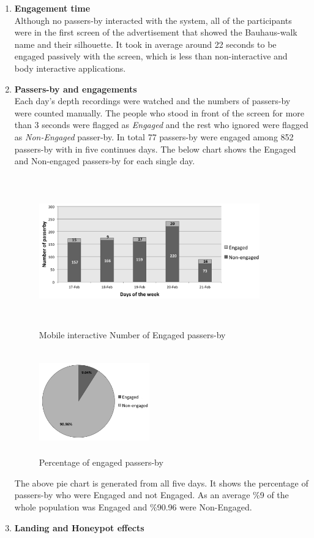 \begin{enumerate}
\newpage
\item \textbf{Engagement time} \\
Although no passers-by interacted with the system, all of the participants were in the first screen of the advertisement that showed the Bauhaus-walk name and their silhouette. It took in average around 22 seconds to be engaged passively with the screen, which is less than non-interactive and body interactive applications. 


\item \textbf{Passers-by and engagements} \\
Each day’s depth recordings were watched and the numbers of passers-by were counted manually. The people who stood in front of the screen for more than 3 seconds were flagged as \emph{Engaged} and the rest who ignored were flagged as \emph{Non-Engaged} passer-by. In total 77 passers-by were engaged among 852 passers-by with in five continues days. The below chart shows the Engaged and Non-engaged passers-by for each single day.
\begin{figure}[H]
    \centering
    \includegraphics[width=0.9\textwidth,height=6.5cm]{Figures/8/mobile_inter_findings/mobile_inter_engage_day}
    \caption{Mobile interactive Number of Engaged passers-by}%
    \label{fig:mobileengagedandengagedby}%
\end{figure}


\begin{figure}[H]
    \centering
    \includegraphics[width=0.45\textwidth,height=4.5cm]{Figures/8/mobile_inter_findings/mobile_eng_percentage}
    \caption{Percentage of engaged passers-by}%
    \label{fig:mobileengagedpasserbypercentage}%
\end{figure}

The above pie chart is generated from all five days. It shows the percentage of passers-by who were Engaged and not Engaged. As an average \%9 of the whole population was Engaged and \%90.96 were Non-Engaged.

\item \textbf{Landing and Honeypot effects}
\end{enumerate}

